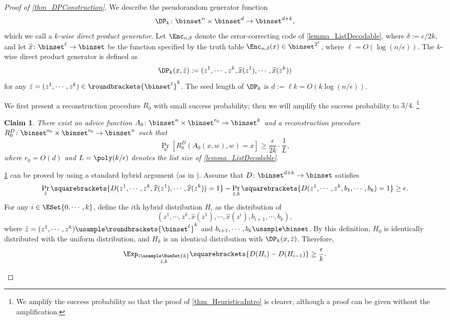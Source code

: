 \documentclass[11pt]{article}
\numberwithin{equation}{section}
\newtheorem{claim}[theorem]{Claim}
\theoremstyle{definition}
\theoremstyle{plain}
\begin{document}
\begin{proof}
  [Proof of \cref{thm_DPConstruction}]
  We describe the pseudorandom generator function $$\DP_k \colon \binset^n \times \binset^d \to \binset^{d+k},$$
  which we call a \emph{$k$-wise direct product generator}.
  Let $\Enc_{n, \delta}$ denote the error-correcting code of \cref{lemma_ListDecodable},
  where $\delta := \epsilon / 2 k$,
  and let
  $\widehat{x} \colon \binset^{\ell} \to \binset$
  be
  the function specified by the truth table $\Enc_{n, \delta}(x) \in \binset^{2^{{\ell}}}$,
  where
  ${\ell} = O(\log (n / \epsilon))$.
  The $k$-wise direct product generator is defined as
  $$
    \DP_k(x, \bar{z}) := (z^1, \cdots, z^k, \widehat{x}(z^1), \cdots, \widehat{x}(z^k))
  $$
  for any $\bar{z} = (z^1, \cdots, z^k) \in \roundbrackets{\binset^{\ell}}^k$.
  The seed length of $\DP_k$ is $d := \ell k = O(k \log (n/\epsilon))$.

  We first present a reconstruction procedure $R_0$ with small success probability;
  then we will amplify the success probability to $3/4.$%
  \footnote{
    We amplify the success probability so that the proof of \cref{thm_HeuristicaIntro} is
    clearer,
    although
    a proof can be given without the amplification.
  }
  \begin{claim}
    \label{claim_weaksecurityofDP}
    There exist an advice function $A_0 \colon \binset^{n} \times \binset^{r_0} \to \binset^{k}$
    and
    a reconstruction procedure $R_0^D \colon \binset^{a_0} \times \binset^{r_0} \to \binset^n$
    such that
    $$
      \Pr_w [R_0^D(A_0(x, w), w) = x] \ge \frac{\epsilon}{2k} \cdot \frac{1}{L},
    $$
    where $r_0 = O(d)$ and $L = \poly(k/\epsilon)$ denotes the list size of \cref{lemma_ListDecodable}.
  \end{claim}

  \begin{claimproof}
    \cref{claim_weaksecurityofDP} can be proved by using a standard hybrid argument (as in \cite{NisanW94_jcss_journals,Vadhan12_fttcs_journals}).
    Assume that $D \colon \binset^{d+k} \to \binset$ satisfies
    $$
      \Pr_{\bar{z}} \squarebrackets{ D(z^1, \cdots, z^k, \widehat{x}(z^1), \cdots, \widehat{x}(z^k)) = 1 }
      -
      \Pr_{\bar{z}, b} \squarebrackets{ D(z^1, \cdots, z^k, b_1, \cdots, b_k) = 1 }
      \ge \epsilon.
    $$
    For any $i \in \ESet{0, \cdots, k}$,
    define the $i$th hybrid distribution $H_i$ as
    the distribution of
    $$(z^1, \cdots, z^k, \widehat{x}(z^1), \cdots, \widehat{x}(z^i), b_{i+1}, \cdots, b_k),$$
    where $\bar{z} = (z^1, \cdots, z^k) \usample \roundbrackets{ \binset^{\ell} }^k$
    and $b_{i+1}, \cdots, b_k \usample \binset$.
    By this definition, $H_0$ is identically distributed with the uniform distribution, and $H_k$ is an identical distribution with $\DP_k(x, \bar{z})$.
    Therefore,
    \[
      \Exp_{\substack{i \usample \NumSet{k} \\ \bar{z}, b}} \squarebrackets {
        D(H_i) - D(H_{i-1})
      }
      \ge \frac{\epsilon}{k}.
    \]


\end{claimproof}
\end{proof}
\end{document}
